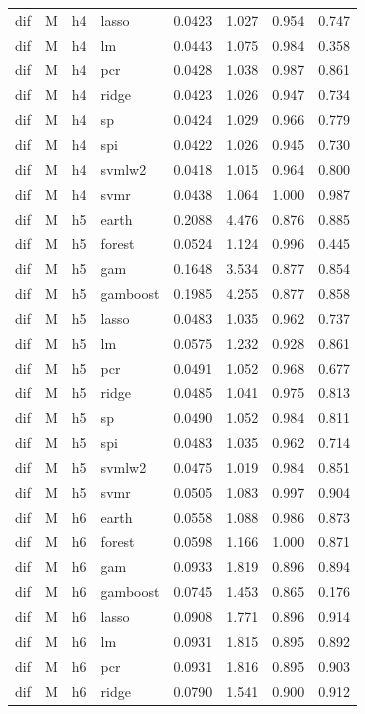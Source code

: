 \begin{ThreePartTable}
\begin{longtable}[t]{llclcccc}
dif & M & h4 & lasso & 0.0423 & 1.027 & 0.954 & 0.747\\
dif & M & h4 & lm & 0.0443 & 1.075 & 0.984 & 0.358\\
dif & M & h4 & pcr & 0.0428 & 1.038 & 0.987 & 0.861\\
dif & M & h4 & ridge & 0.0423 & 1.026 & 0.947 & 0.734\\
dif & M & h4 & sp & 0.0424 & 1.029 & 0.966 & 0.779\\
dif & M & h4 & spi & 0.0422 & 1.026 & 0.945 & 0.730\\
dif & M & h4 & svmlw2 & 0.0418 & 1.015 & 0.964 & 0.800\\
dif & M & h4 & svmr & 0.0438 & 1.064 & 1.000 & 0.987\\
\addlinespace
dif & M & h5 & earth & 0.2088 & 4.476 & 0.876 & 0.885\\
dif & M & h5 & forest & 0.0524 & 1.124 & 0.996 & 0.445\\
dif & M & h5 & gam & 0.1648 & 3.534 & 0.877 & 0.854\\
dif & M & h5 & gamboost & 0.1985 & 4.255 & 0.877 & 0.858\\
dif & M & h5 & lasso & 0.0483 & 1.035 & 0.962 & 0.737\\
dif & M & h5 & lm & 0.0575 & 1.232 & 0.928 & 0.861\\
dif & M & h5 & pcr & 0.0491 & 1.052 & 0.968 & 0.677\\
dif & M & h5 & ridge & 0.0485 & 1.041 & 0.975 & 0.813\\
dif & M & h5 & sp & 0.0490 & 1.052 & 0.984 & 0.811\\
dif & M & h5 & spi & 0.0483 & 1.035 & 0.962 & 0.714\\
dif & M & h5 & svmlw2 & 0.0475 & 1.019 & 0.984 & 0.851\\
dif & M & h5 & svmr & 0.0505 & 1.083 & 0.997 & 0.904\\
\addlinespace
dif & M & h6 & earth & 0.0558 & 1.088 & 0.986 & 0.873\\
dif & M & h6 & forest & 0.0598 & 1.166 & 1.000 & 0.871\\
dif & M & h6 & gam & 0.0933 & 1.819 & 0.896 & 0.894\\
dif & M & h6 & gamboost & 0.0745 & 1.453 & 0.865 & 0.176\\
dif & M & h6 & lasso & 0.0908 & 1.771 & 0.896 & 0.914\\
dif & M & h6 & lm & 0.0931 & 1.815 & 0.895 & 0.892\\
dif & M & h6 & pcr & 0.0931 & 1.816 & 0.895 & 0.903\\
dif & M & h6 & ridge & 0.0790 & 1.541 & 0.900 & 0.912\\

\end{longtable}
\end{ThreePartTable}
